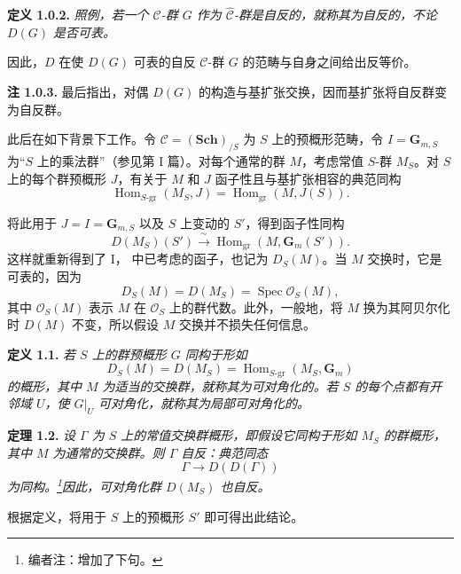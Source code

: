 \medskip
\noindent{}\textbf{定义 1.0.2.}
\textit{照例，若一个 \(\mathscr C\)-群 \(G\) 作为 \(\widehat{\mathscr C}\)-群是自反的，就称其为\emph{自反的}，不论 \(D(G)\) 是否可表。}

因此，\(D\) 在使 \(D(G)\) 可表的自反 \(\mathscr C\)-群 \(G\) 的范畴与自身之间给出反等价。

\medskip
\noindent{}\textbf{注 1.0.3.}
最后指出，对偶 \(D(G)\) 的构造与基扩张交换，因而基扩张将自反群变为自反群。

此后在如下背景下工作。令 \(\mathscr C=(\mathbf{Sch})_{/S}\) 为 \(S\) 上的预概形范畴，令 \(I=\mathbf G_{m,S}\) 为“\(S\) 上的乘法群”（参见第 I 篇）。对每个通常的群 \(M\)，考虑常值 \(S\)-群 \(M_S\)。对 \(S\) 上的每个群预概形 \(J\)，有关于 \(M\) 和 \(J\) 函子性且与基扩张相容的典范同构
\[
  \operatorname{Hom}_{S\text{-}\mathrm{gr}}(M_S,J)
  =\operatorname{Hom}_{\mathrm{gr}}(M,J(S)).
\]

将此用于 \(J=I=\mathbf G_{m,S}\) 以及 \(S\) 上变动的 \(S'\)，得到函子性同构
\begin{equation}
  \tag{1.0.4}
  D(M_S)(S')
  \xrightarrow{\ \sim\ }
  \operatorname{Hom}_{\mathrm{gr}}(M,\mathbf G_m(S')).
\end{equation}
这样就重新得到了 I， 中已考虑的函子，也记为 \(D_S(M)\)。当 \(M\) 交换时，它是可表的，因为
\[
  D_S(M)=D(M_S)=\operatorname{Spec}\mathscr O_S(M),
\]
其中 \(\mathscr O_S(M)\) 表示 \(M\) 在 \(\mathscr O_S\) 上的群代数。此外，一般地，将 \(M\) 换为其阿贝尔化时 \(D(M)\) 不变，所以假设 \(M\) 交换并不损失任何信息。

\medskip
\noindent{}\textbf{定义 1.1.}
\textit{若 \(S\) 上的群预概形 \(G\) 同构于形如}
\[
  D_S(M)=D(M_S)
  =\operatorname{Hom}_{S\text{-}\mathrm{gr}}(M_S,\mathbf G_m)
\]
\textit{的概形，其中 \(M\) 为适当的交换群，就称其为\emph{可对角化的}。若 \(S\) 的每个点都有开邻域 \(U\)，使 \(G|_U\) 可对角化，就称其为\emph{局部可对角化的}。}

\medskip
\noindent{}\textbf{定理 1.2.}
\textit{设 \(\Gamma\) 为 \(S\) 上的常值交换群概形，即假设它同构于形如 \(M_S\) 的群概形，其中 \(M\) 为通常的交换群。则 \(\Gamma\) 自反：典范同态}
\[
  \Gamma\longrightarrow D(D(\Gamma))
\]
\textit{为同构。\footnote{编者注：增加了下句。}因此，可对角化群 \(D(M_S)\) 也自反。}

根据定义，将用于 \(S\) 上的预概形 \(S'\) 即可得出此结论。

